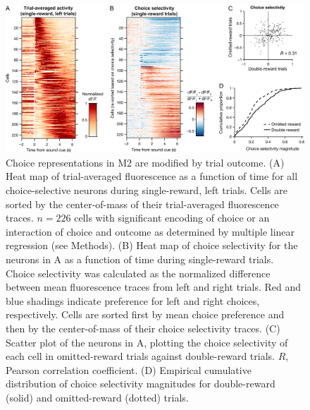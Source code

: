 \begin{figure}[htbp]

\begin{center}
\includegraphics[width=\textwidth]{Figures/Chapter2/CC_fig5} 
\end{center}

\caption[Choice representations were modified by trial outcome]
{Choice representations in M2 are modified by trial outcome. (A) Heat map of trial-averaged fluorescence as a function of time for all choice-selective neurons during single-reward, left trials. Cells are sorted by the center-of-mass of their trial-averaged fluorescence traces. $n = 226$ cells with significant encoding of choice or an interaction of choice and outcome as determined by multiple linear regression (see Methods). (B) Heat map of choice selectivity for the neurons in A as a function of time during single-reward trials. Choice selectivity was calculated as the normalized difference between mean fluorescence traces from left and right trials. Red and blue shadings indicate preference for left and right choices, respectively. Cells are sorted first by mean choice preference and then by the center-of-mass of their choice selectivity traces. (C) Scatter plot of the neurons in A, plotting the choice selectivity of each cell in omitted-reward trials against double-reward trials. $R$, Pearson correlation coefficient. (D) Empirical cumulative distribution of choice selectivity magnitudes for double-reward (solid) and omitted-reward (dotted) trials.}

\label{fig:CC_fig5}
\end{figure}